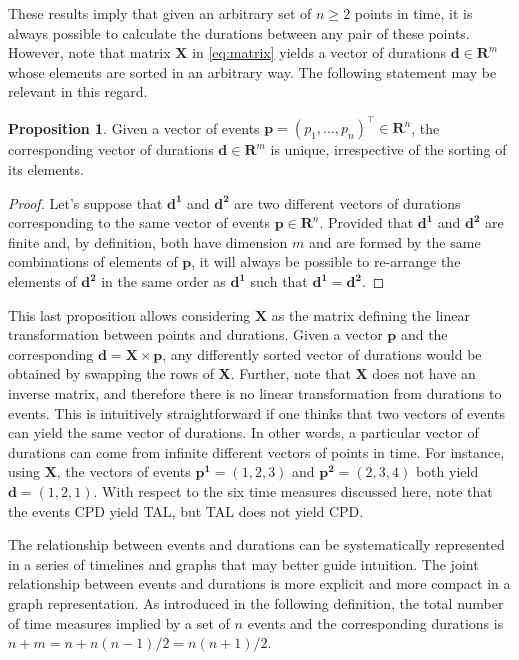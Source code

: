 \documentclass{bmcart}
\theoremstyle{definition}
\newtheorem{proposition}{Proposition}[section]
\begin{document}
These results imply that given an arbitrary set of $n\geq2$ points in time, it
is always possible to calculate the durations between any pair of these points. However, note that matrix $\boldsymbol{X}$ in \eqref{eq:matrix} yields a vector of durations $\boldsymbol{d}\in\mathbf{R}^m$ whose elements are sorted in an arbitrary way. The following statement may be relevant in this regard.

\begin{proposition}
 Given a vector of events $\boldsymbol{p}=(p_1,\ldots,p_n)^\top\in\mathbf{R}^n$, the corresponding vector of durations $\boldsymbol{d}\in\mathbf{R}^m$ is unique, irrespective of the sorting of its elements.
\end{proposition}

\begin{proof}
 Let's suppose that $\boldsymbol{d^1}$ and $\boldsymbol{d^2}$ are two different
 vectors of durations corresponding to the same vector of events
 $\boldsymbol{p}\in\mathbf{R}^n$. Provided that $\boldsymbol{d^1}$ and
 $\boldsymbol{d^2}$ are finite and, by definition, both have dimension $m$ and are formed by the same combinations of elements of $\boldsymbol{p}$, it will always be possible to re-arrange the elements of $\boldsymbol{d^2}$ in the same order as $\boldsymbol{d^1}$ such that $\boldsymbol{d^1}=\boldsymbol{d^2}$.
\end{proof}

This last proposition allows considering $\boldsymbol{X}$ as the matrix defining
the linear transformation between points and durations. Given a vector
$\boldsymbol{p}$ and the corresponding
$\boldsymbol{d}=\boldsymbol{X}\times\boldsymbol{p}$, any differently sorted
vector of durations would be obtained by swapping the rows of $\boldsymbol{X}$.
Further, note that $\boldsymbol{X}$ does not have an inverse matrix, and
therefore there is no linear transformation from durations to events. This is
intuitively straightforward if one thinks that two vectors of events can yield
the same vector of durations. In other words, a particular vector of durations
can come from infinite different vectors of points in time. For instance, using
$\boldsymbol{X}$, the vectors of events $\boldsymbol{p^1}=(1,2,3)$ and
$\boldsymbol{p^2}=(2,3,4)$ both yield $\boldsymbol{d}=(1,2,1)$. With respect to
the six time measures discussed here, note that the events CPD yield TAL, but TAL does not yield CPD.

The relationship between events and durations can be
systematically represented in a series of timelines and graphs that may better
guide intuition.
The joint relationship between events and durations is more explicit and more
compact in a graph representation. As introduced in the following definition, the total number of time measures implied by a set of $n$ events and the corresponding durations is 
$n+m=n+n(n-1)/2=n(n+1)/2$. 
\end{document}
